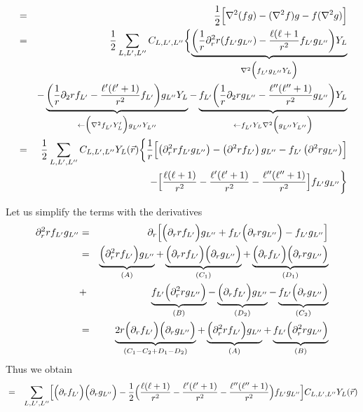 \documentclass[11pt,a4paper]{report}
\begin{document}
\begin{eqnarray*}
[\nabla{f}][\nabla{g}]
&=&\frac{1}{2} \Bigl[\nabla^2(fg)-(\nabla^2 f)g-f(\nabla^2 g)\Bigr]
\\
&=&\frac{1}{2}\sum_{L,L',L''}C_{L,L',L''} 
\biggl\lbrace 
\underbrace{
\biggl(
\frac{1}{r}\partial^2_r r (f_{L'}g_{L''})-\frac{\ell(\ell+1}{r^2}f_{L'}g_{L''}
\biggr)Y_L
}_{\nabla^2\Bigl(f_{L'}g_{L''}Y_L\Bigr)}
\\
&&-
\underbrace{
\biggl(
\frac{1}{r}\partial_2 r f_{L'}-\frac{\ell'(\ell'+1)}{r^2}f_{L'}\biggr)g_{L''}
Y_L
}_{\leftarrow\Bigl(\nabla^2f_{L'}Y_L'\Bigr)g_{L''}Y_{L''}}
-\underbrace{
f_{L'}\biggl(\frac{1}{r}\partial_2 r g_{L''}-\frac{\ell''(\ell''+1)}{r^2}g_{L''}
\biggr)Y_L
}_{\leftarrow f_{L'}Y_L\nabla^2\Bigl(g_{L''}Y_{L''}\Bigr)}
\\
&=&\frac{1}{2}\sum_{L,L',L''}C_{L,L',L''} Y_L(\vec{r})
\biggl\lbrace
\frac{1}{r}\Bigl[ 
\left(\partial^2_r r f_{L'}g_{L''}\right)
-\left(\partial^2 r f_{L'}\right)g_{L''}
-f_{L'}\left(\partial^2 r g_{L''}\right)\Bigr]
\\
&&\hspace{3cm}
-\Bigl[ \frac{\ell(\ell+1)}{r^2}-\frac{\ell'(\ell'+1)}{r^2}-\frac{\ell''(\ell''+1)}{r^2}\Bigr]
f_{L'}g_{L''}\biggr\rbrace
\end{eqnarray*}

Let us simplify the terms with the derivatives
\begin{eqnarray}
\partial^2_r r f_{L'}g_{L''}
&=&\partial_r\Bigl[ 
\Bigl(\partial_r r f_{L'}\Bigr) g_{L''}
+f_{L'}\Bigl(\partial_r r g_{L''}\Bigr)-f_{L'}g_{L''}\Bigr]
\nonumber\\
&=&
\underbrace{
\Bigl(\partial^2_r r f_{L'}\Bigr) g_{L''}
}_{(A)}
+\underbrace{
\Bigl(\partial_r r f_{L'}\Bigr)\Bigl( \partial_r g_{L''}\Bigr)
}_{(C_1)}
+
\underbrace{
\Bigl(\partial_rf_{L'}\Bigr)\Bigl(\partial_r r g_{L''}\Bigr)
}_{(D_1)}
\nonumber\\
&+&\underbrace{
f_{L'}\Bigl(\partial^2_r r g_{L''}\Bigr)
}_{(B)}
-\underbrace{
\Bigl(\partial_rf_{L'}\Bigr)g_{L''}
}_{(D_2)}
-\underbrace{
f_{L'}\Bigl(\partial_rg_{L''}\Bigr)
}_{(C_2)}
\nonumber\\
&=&
\underbrace{2r\Bigl(\partial_r f_{L'}\Bigr)\Bigl( \partial_r g_{L''}\Bigr)
}_{(C_1-C_2+D_1-D_2)}
+\underbrace{\Bigl(\partial^2_r r f_{L'}\Bigr) g_{L''}}_{(A)}
+\underbrace{f_{L'}\Bigl(\partial^2_r r g_{L''}\Bigr)}_{(B)}
\end{eqnarray}
Thus we obtain
\begin{eqnarray*}
[\nabla{f}][\nabla{g}]
&=&\sum_{L,L',L''}\Bigl[ 
\Bigl(\partial_r f_{L'}\Bigr)\Bigl(\partial_rg_{L''}\Bigr)
-\frac{1}{2}\Bigl( \frac{\ell(\ell+1)}{r^2}-\frac{\ell'(\ell'+1)}{r^2}-\frac{\ell''(\ell''+1)}{r^2}\Bigr)
f_{L'}g_{L''}\Bigr]C_{L,L',L''}Y_L(\vec{r})
\end{eqnarray*}
\end{document}
